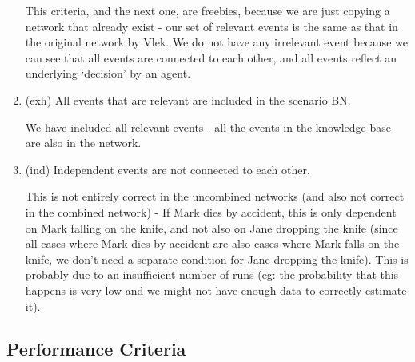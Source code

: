 \begin{enumerate}
This criteria, and the next one, are freebies, because we are just copying a network that already exist - our set of relevant events is the same as that in the original network by Vlek. We do not have any irrelevant event because we can see that all events are connected to each other, and all events reflect an underlying `decision' by an agent.

\item (exh) All events that are relevant are included in the scenario BN.

We have included all relevant events - all the events in the knowledge base are also in the network.

\item (ind) Independent events are not connected to each other.

This is not entirely correct in the uncombined networks (and also not correct in the combined network) - If Mark dies by accident, this is only dependent on Mark falling on the knife, and not also on Jane dropping the knife (since all cases where Mark dies by accident are also cases where Mark falls on the knife, we don't need a separate condition for Jane dropping the knife). This is probably due to an insufficient number of runs (eg: the probability that this happens is very low and we might not have enough data to correctly estimate it).


\end{enumerate}

\subsection{Performance Criteria}


